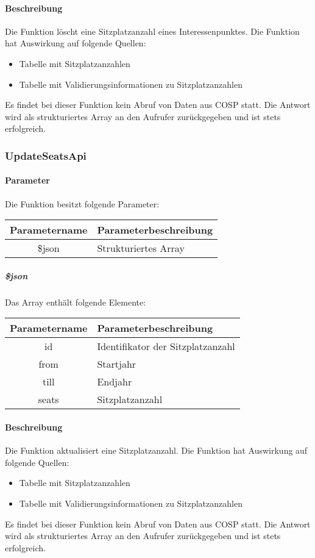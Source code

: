 \paragraph{Beschreibung} Die Funktion löscht eine Sitzplatzanzahl eines Interessenpunktes. Die Funktion hat Auswirkung auf folgende Quellen:
\begin{itemize}
	\item Tabelle mit Sitzplatzanzahlen
	\item Tabelle mit Validierungsinformationen zu Sitzplatzanzahlen
\end{itemize}
Es findet bei dieser Funktion kein Abruf von Daten aus {\glqq COSP\grqq} statt. Die Antwort wird als strukturiertes Array an den Aufrufer zurückgegeben und ist stets erfolgreich.
\subsubsection{UpdateSeatsApi}
\paragraph{Parameter} Die Funktion besitzt folgende Parameter:
\begin{table}[H]
	\begin{tabular}{|c|p{11cm}|}
		\hline
		\textbf{Parametername} & \textbf{Parameterbeschreibung} \\ \hline
		\$json & Strukturiertes Array \\ \hline
	\end{tabular}
\end{table}
\subparagraph{\$json}Das Array enthält folgende Elemente:
\begin{table}[H]
	\begin{tabular}{|c|p{11cm}|}
		\hline
		\textbf{Parametername} & \textbf{Parameterbeschreibung} \\ \hline
		id       & Identifikator der Sitzplatzanzahl \\ \hline
		from     & Startjahr \\ \hline
		till     & Endjahr \\ \hline
		seats    & Sitzplatzanzahl \\ \hline
	\end{tabular}
\end{table}
\paragraph{Beschreibung} Die Funktion aktualisiert eine Sitzplatzanzahl. Die Funktion hat Auswirkung auf folgende Quellen:
\begin{itemize}
	\item Tabelle mit Sitzplatzanzahlen
	\item Tabelle mit Validierungsinformationen zu Sitzplatzanzahlen
\end{itemize}
Es findet bei dieser Funktion kein Abruf von Daten aus {\glqq COSP\grqq} statt. Die Antwort wird als strukturiertes Array an den Aufrufer zurückgegeben und ist stets erfolgreich.

